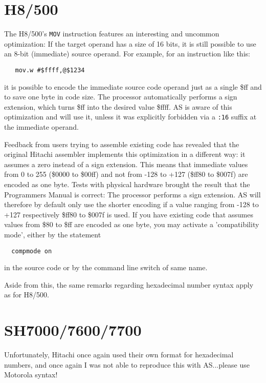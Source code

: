 \documentclass[12pt,twoside]{report}
\newcommand{\tty}[1]{{\tt #1}}
\newcommand{\asname}{{AS}}
\begin{document}
\section{H8/500}

The H8/500's {\tt MOV} instruction features an interesting and uncommon
optimization: If the target operand has a size of 16 bits, it is still possible
to use an 8-bit (immediate) source operand.  For example, for an instruction
like this:
\begin{verbatim}
   mov.w #$ffff,@$1234
\end{verbatim}
it is possible to encode the immediate source code operand just as a single
\$ff and to save one byte in code size.  The processor automatically performs
a sign extension, which turns \$ff into the desired value \$ffff.  \asname{} is aware
of this optimization and will use it, unless it was explicitly forbidden via
a \tty{:16} suffix at the immediate operand.

Feedback from users trying to assemble existing code has revealed that the
original Hitachi assembler implements this optimization in a different way:
it assumes a zero instead of a sign extension.  This means that immediate
values from 0 to 255 (\$0000 to \$00ff) and not from -128 to +127 (\$ff80 to
\$007f) are encoded as one byte.  Tests with physical hardware brought the
result that the Programmers Manual is correct: The processor performs a sign
extension.  \asname{} will therefore by default only use the shorter encoding if 
a value ranging from -128 to +127 respectively \$ff80 to \$007f is used.
If you have existing code that assumes values from \$80 to \$ff are encoded
as one byte, you may activate a 'compatibility mode', either by the
statement
\begin{verbatim}
  compmode on
\end{verbatim}
in the source code or by the command line switch of same name.

Aside from this, the same remarks regarding hexadecimal number syntax apply
as for H8/500.


\section{SH7000/7600/7700}

Unfortunately, Hitachi once again used their own format for
hexadecimal numbers, and once again I was not able to reproduce this
with \asname{}...please use Motorola syntax!
\end{document}
